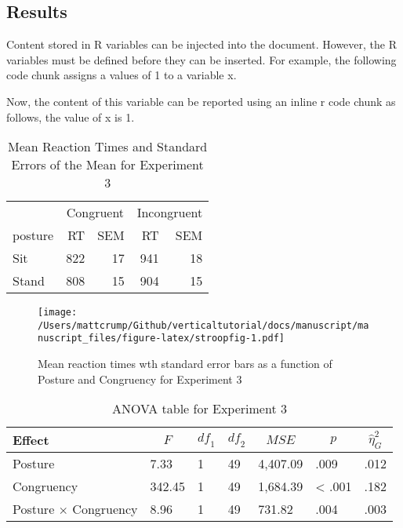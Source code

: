 \documentclass[
  english,
  man,floatsintext]{apa6}
\begin{document}
\hypertarget{results}{%
\subsection{Results}\label{results}}

Content stored in R variables can be injected into the document. However, the R variables must be defined before they can be inserted. For example, the following code chunk assigns a values of 1 to a variable x.

Now, the content of this variable can be reported using an inline r code chunk as follows, the value of x is 1.

\begin{table}

\caption{\label{tab:meanstable}Mean Reaction Times and Standard Errors of the Mean for Experiment 3}
\centering
\begin{tabular}[t]{lrrrr}
\toprule
\multicolumn{1}{c}{ } & \multicolumn{2}{c}{Congruent} & \multicolumn{2}{c}{Incongruent} \\
\cmidrule(l{3pt}r{3pt}){2-3} \cmidrule(l{3pt}r{3pt}){4-5}
posture & RT & SEM & RT & SEM\\
\midrule
Sit & 822 & 17 & 941 & 18\\
Stand & 808 & 15 & 904 & 15\\
\bottomrule
\end{tabular}
\end{table}

\begin{figure}
\centering
\texttt{[image: /Users/mattcrump/Github/verticaltutorial/docs/manuscript/manuscript\_files/figure-latex/stroopfig-1.pdf]}
\caption{\label{fig:stroopfig}Mean reaction times wth standard error bars as a function of Posture and Congruency for Experiment 3}
\end{figure}

\begin{table}[tbp]

\begin{center}
\begin{threeparttable}

\caption{\label{tab:aovtable}ANOVA table for Experiment 3}

\begin{tabular}{lllllll}
\toprule
Effect & \multicolumn{1}{c}{$F$} & \multicolumn{1}{c}{$\mathit{df}_1$} & \multicolumn{1}{c}{$\mathit{df}_2$} & \multicolumn{1}{c}{$\mathit{MSE}$} & \multicolumn{1}{c}{$p$} & \multicolumn{1}{c}{$\hat{\eta}^2_G$}\\
\midrule
Posture & 7.33 & 1 & 49 & 4,407.09 & .009 & .012\\
Congruency & 342.45 & 1 & 49 & 1,684.39 & < .001 & .182\\
Posture $\times$ Congruency & 8.96 & 1 & 49 & 731.82 & .004 & .003\\
\bottomrule
\end{tabular}

\end{threeparttable}
\end{center}

\end{table}
\end{document}
